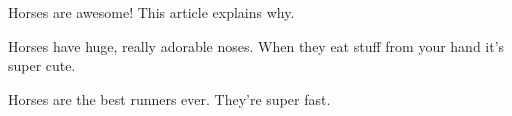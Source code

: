 Horses are awesome!
This article explains why.


Horses have huge, really adorable noses.
When they eat stuff from your hand it's super cute.


Horses are the best runners ever.
They're super fast.

